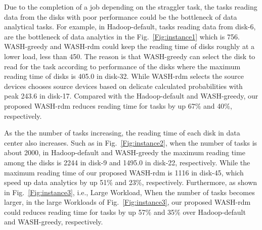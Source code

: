 \documentclass[conference]{IEEEtran}
\begin{document}
Due to the completion of a job depending on the straggler task, the tasks reading data from the disks with poor performance could be the bottleneck of data analytical tasks. For example, in Hadoop-default, tasks reading data from disk-6, are the bottleneck of data analytics in the Fig.~\ref{Fig:instance1} which is 756. WASH-greedy and WASH-rdm could keep the reading time of disks roughly at a lower load, less than 450. The reason is that WASH-greedy can select the disk to read for the task according to performance of the disks where the maximum reading time of disks is 405.0 in disk-32. While WASH-rdm selects the source devices chooses source devices based on delicate calculated probabilities with peak 243.6 in disk-17. 
Compared with the Hadoop-default and WASH-greedy, our proposed WASH-rdm reduces reading time for tasks by up 67\% and 40\%, respectively.   

As the the number of tasks increasing, the reading time of each disk in data center also increases. Such as in Fig.~\ref{Fig:instance2}, when the number of tasks is about 2000, in Hadoop-default and WASH-greedy the maximum reading time among the disks is 2244 in disk-9 and 1495.0 in disk-22, respectively. While the maximum reading time of our proposed WASH-rdm is 1116 in disk-45, which speed up data analytics by up 51\% and 23\%, respectively. 
Furthermore, as shown in Fig.~\ref{Fig:instance3}, i.e., Large Workload,  When the number of tasks becomes larger, in the large Workloads of Fig.~\ref{Fig:instance3}, our proposed WASH-rdm could reduces reading time for tasks by up 57\% and 35\% over Hadoop-default and WASH-greedy, respectively. 


\end{document}

